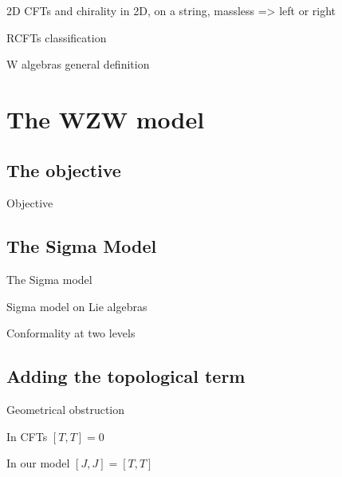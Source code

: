 \documentclass{beamer}
\begin{document}
\begin{frame}{2D CFTs and chirality}
    in 2D, on a string, massless => left or right
\end{frame}

\begin{frame}{RCFTs}
    classification
\end{frame}

\begin{frame}{W algebras}
    general definition
\end{frame}



\section{The WZW model}
\subsection{The objective}


\begin{frame}{Objective}
    
\end{frame}


\subsection{The Sigma Model}


\begin{frame}{The Sigma model}
    
\end{frame}

\begin{frame}{Sigma model on Lie algebras}
    
\end{frame}

\begin{frame}{Conformality at two levels}
    
\end{frame}


\subsection{Adding the topological term}


\begin{frame}{Geometrical obstruction}
  \begin{block}{In CFTs}
  $[T, T] = 0$
  \end{block}
  \begin{block}{In our model}
   $[J, J] = [T, T]$ 
    \end{block}   
\end{frame}
\end{document}

